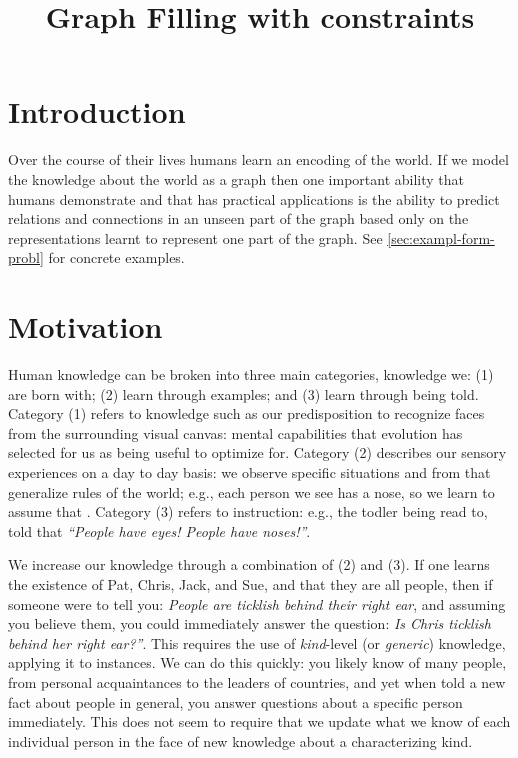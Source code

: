 \documentclass[11pt]{article}
\title{Graph Filling with constraints}
\newcommand{\eg}{e.g.,\xspace}
\begin{document}
\maketitle
\section{Introduction}
\label{sec:introduction}




Over the course of their lives humans learn an encoding of the world.
If we model the knowledge about the world as a graph then one
important ability that humans demonstrate and that has practical
applications is the ability to predict relations and connections in an
unseen part of the graph based only on the representations learnt to
represent one part of the graph. See \ref{sec:exampl-form-probl} for
concrete examples.

\section{Motivation}
Human knowledge can be broken into three main categories, knowledge
we: (1) are born with; (2) learn through examples; and (3) learn
through being told.  Category (1) refers to knowledge such as our
predisposition to recognize faces from the surrounding visual canvas:
mental capabilities that evolution has selected for us as being useful
to optimize for.  Category (2) describes our sensory experiences on a
day to day basis: we observe specific situations and from that
generalize rules of the world; \eg each person we see has a nose, so
we learn to assume that . Category (3) refers
to instruction: \eg the todler being read to, told that \emph{``People
  have eyes! People have noses!''}.

We increase our knowledge through a combination of (2) and (3).  If
one learns the existence of Pat, Chris, Jack, and Sue, and that they
are all people, then if someone were to tell you: \emph{People are
  ticklish behind their right ear}, and assuming you believe them,
you could immediately answer the question: \emph{Is Chris ticklish
  behind her right ear?''}.  This requires the use of
\emph{kind}-level (or \emph{generic}) knowledge, applying it to
instances.  We can do this quickly: you likely know of many people,
from personal acquaintances to the leaders of countries, and yet when
told a new fact about people in general, you answer questions about a
specific person immediately.  This does not seem to require that we
update what we know of each individual person in the face of new
knowledge about a characterizing kind.
\end{document}
